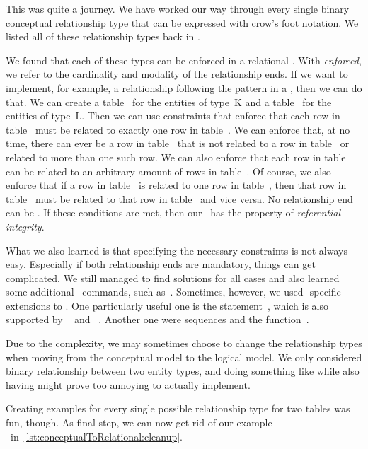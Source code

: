 %
%
%
%
%
This was quite a journey.
We have worked our way through every single binary conceptual relationship type that can be expressed with crow's foot notation.
We listed all of these relationship types back in .

We found that each of these types can be enforced in a relational \dbms.
With \emph{enforced}, we refer to the cardinality and modality of the relationship ends.
If we want to implement, for example, a relationship following the pattern  in a \dbms, then we can do that.
We can create a table~ for the entities of type~K and a table~ for the entities of type~L.
Then we can use constraints that enforce that each row in table~ must be related to exactly one row in table~.
We can enforce that, at no time, there can ever be a row in table~ that is not related to a row in table~ or related to more than one such row.
We can also enforce that each row in table~ can be related to an arbitrary amount of rows in table~.
Of course, we also enforce that if a row in table~ is related to one row in table~, then that row in table~ must be related to that row in table~ and vice versa.
No relationship end can be .
If these conditions are met, then our \db\ has the property of \emph{referential integrity}.

What we also learned is that specifying the necessary constraints is not always easy.
Especially if both relationship ends are mandatory, things can get complicated.
We still managed to find solutions for all cases and also learned some additional \sql\ commands, such as~.
Sometimes, however, we used \postgresql-specific extensions to \sql.
One particularly useful one is the  statement~\cite{PGDG:PD:RDFMR}, which is also supported by \mariadb~\cite{M:MSD:IR} and \sqlite~\cite{HWACIS:R}.
Another one were sequences and the  function~\cite{PGDG:PD:CS,PGDG:PD:SMF}.

Due to the complexity, we may sometimes choose to change the relationship types when moving from the conceptual model to the logical model.
We only considered binary relationship between two entity types, and doing something like  while also having  might prove too annoying to actually implement.

Creating examples for every single possible relationship type for two tables was fun, though.
As final step, we can now get rid of our example \db\ in~\cref{lst:conceptualToRelational:cleanup}.%
%
\endhsection%
